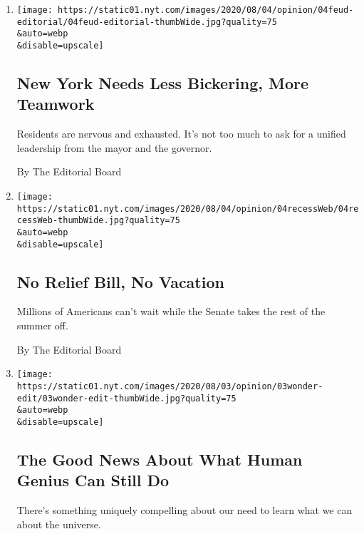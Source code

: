 \begin{enumerate}
\def\labelenumi{\arabic{enumi}.}
\item
  \href{/2020/08/04/opinion/cuomo-de-blasio-coronavirus-nyc.html}{}

  \texttt{[image: https://static01.nyt.com/images/2020/08/04/opinion/04feud-editorial/04feud-editorial-thumbWide.jpg?quality=75\\\&auto=webp\\\&disable=upscale]}

  \hypertarget{new-york-needs-less-bickering-more-teamwork}{%
  \subsection{New York Needs Less Bickering, More
  Teamwork}\label{new-york-needs-less-bickering-more-teamwork}}

  Residents are nervous and exhausted. It's not too much to ask for a
  unified leadership from the mayor and the governor.

  By The Editorial Board
\item
  \href{/2020/08/04/opinion/coronavirus-relief-bill-senate-recess.html}{}

  \texttt{[image: https://static01.nyt.com/images/2020/08/04/opinion/04recessWeb/04recessWeb-thumbWide.jpg?quality=75\\\&auto=webp\\\&disable=upscale]}

  \hypertarget{no-relief-bill-no-vacation}{%
  \subsection{No Relief Bill, No
  Vacation}\label{no-relief-bill-no-vacation}}

  Millions of Americans can't wait while the Senate takes the rest of
  the summer off.

  By The Editorial Board
\item
  \href{/2020/08/03/opinion/spacex-stonehenge-mars.html}{}

  \texttt{[image: https://static01.nyt.com/images/2020/08/03/opinion/03wonder-edit/03wonder-edit-thumbWide.jpg?quality=75\\\&auto=webp\\\&disable=upscale]}

  \hypertarget{the-good-news-about-what-human-genius-can-still-do}{%
  \subsection{The Good News About What Human Genius Can Still
  Do}\label{the-good-news-about-what-human-genius-can-still-do}}

  There's something uniquely compelling about our need to learn what we
  can about the universe.


\end{enumerate}
